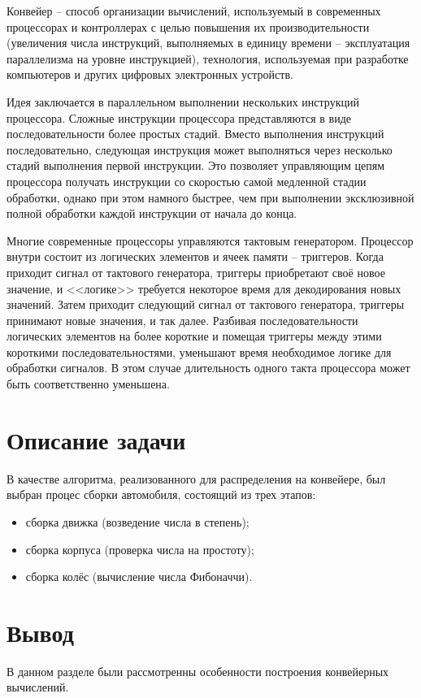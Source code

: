\documentclass[12pt]{report}
\begin{document}
Конвейер -- способ организации вычислений, используемый в современных процессорах и контроллерах с целью повышения их производительности (увеличения числа инструкций, выполняемых в единицу времени -- эксплуатация параллелизма на уровне инструкцией), технология, используемая при разработке компьютеров и других цифровых электронных устройств.

Идея заключается в параллельном выполнении нескольких инструкций процессора. Сложные инструкции процессора представляются в виде последовательности более простых стадий. Вместо выполнения инструкций последовательно, следующая инструкция может выполняться через несколько стадий выполнения первой инструкции. Это позволяет управляющим цепям процессора получать инструкции со скоростью самой медленной стадии обработки, однако при этом намного быстрее, чем при выполнении эксклюзивной полной обработки каждой инструкции от начала до конца.

Многие современные процессоры управляются тактовым генератором. Процессор внутри состоит из логических элементов и ячеек памяти -- триггеров. Когда приходит сигнал от тактового генератора, триггеры приобретают своё новое значение, и <<логике>> требуется некоторое время для декодирования новых значений. Затем приходит следующий сигнал от тактового генератора, триггеры принимают новые значения, и так далее. Разбивая последовательности логических элементов на более короткие и помещая триггеры между этими короткими последовательностями, уменьшают время необходимое логике для обработки сигналов. В этом случае длительность одного такта процессора может быть соответственно уменьшена.

\section{Описание задачи}

В качестве алгоритма, реализованного для распределения на конвейере, был выбран процес сборки автомобиля, состоящий из трех этапов:

\begin{itemize}
	\item сборка движка (возведение числа в степень);
	\item сборка корпуса (проверка числа на простоту);
	\item сборка колёс (вычисление числа Фибоначчи).
\end{itemize}

\section*{Вывод}
	В данном разделе были рассмотренны особенности построения конвейерных вычислений.
\end{document}
